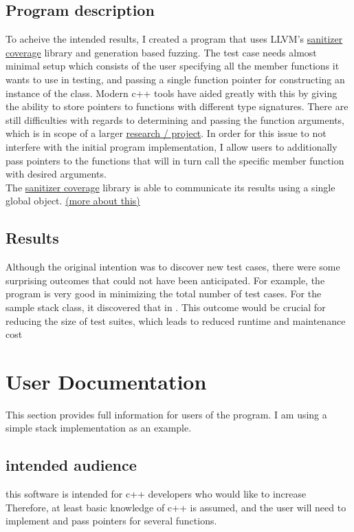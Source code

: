 \documentclass{elteikthesis}[2018/06/06]
\begin{document}
\section{Program description}
\label{sec-1-3}
To acheive the intended results, I created a program that uses LLVM's \uline{sanitizer coverage} library and generation based fuzzing. The test case needs almost minimal setup which consists of the user specifying all the member functions it wants to use in testing, and passing a single function pointer for constructing an instance of the class. Modern c++ tools have aided greatly with this by giving the ability to store pointers to functions with different type signatures. There are still difficulties with regards to determining and passing the function arguments, which is in scope of a larger \uline{research / project}. In order for this issue to not interfere with the initial program implementation, I allow users to additionally pass pointers to the functions that will in turn call the specific member function with desired arguments. \\

The \uline{sanitizer coverage} library is able to communicate its results using a single global object. \uline{(more about this)}  \\
\section{Results}
\label{sec-1-4}
Although the original intention was to discover new test cases, there were some surprising outcomes that could not have been anticipated. For example, the program is very good in minimizing the total number of test cases. For the sample stack class, it discovered that in . This outcome would be crucial for reducing the size of test suites, which leads to reduced runtime and maintenance cost \\
\chapter{User Documentation}
\label{sec-2}
This section provides full information for users of the program. I am using a simple stack implementation as an example. \\

\section{intended audience}
\label{sec-2-1}
this software is intended for c++ developers who would like to increase \\
Therefore, at least basic knowledge of c++ is assumed, and the user will need to implement and pass pointers for several functions. \\
\end{document}

